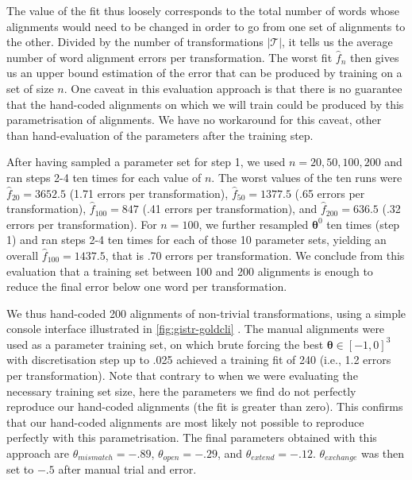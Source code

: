 The value of the fit thus loosely corresponds to the total number of
words whose alignments would need to be changed in order to go from one
set of alignments to the other. Divided by the number of transformations
\(|\mathcal{T}|\), it tells us the average number of word alignment
errors per transformation. The worst fit \(\hat{f}_n\) then gives us an
upper bound estimation of the error that can be produced by training on
a set of size \(n\). One caveat in this evaluation approach is that
there is no guarantee that the hand-coded alignments on which we will
train could be produced by this parametrisation of alignments. We have
no workaround for this caveat, other than hand-evaluation of the
parameters after the training step.

After having sampled a parameter set for step 1, we used
\(n = 20, 50, 100, 200\) and ran steps 2-4 ten times for each value of
\(n\). The worst values of the ten runs were \(\hat{f}_{20} = 3652.5\)
(1.71 errors per transformation), \(\hat{f}_{50} = 1377.5\) (.65 errors
per transformation), \(\hat{f}_{100} = 847\) (.41 errors per
transformation), and \(\hat{f}_{200} = 636.5\) (.32 errors per
transformation). For \(n = 100\), we further resampled \(\bm{\theta}^0\)
ten times (step 1) and ran steps 2-4 ten times for each of those 10
parameter sets, yielding an overall \(\hat{f}_{100} = 1437.5\), that is
.70 errors per transformation. We conclude from this evaluation that a
training set between 100 and 200 alignments is enough to reduce the
final error below one word per transformation.

We thus hand-coded 200 alignments of non-trivial transformations, using
a simple console interface illustrated in \cref{fig:gistr-goldcli} 
. 
The
manual alignments were used as a parameter training set, on which brute
forcing the best \(\bm{\theta} \in [-1, 0]^3\) with discretisation step
up to .025 achieved a training fit of 240 (i.e., 1.2 errors per
transformation). Note that contrary to when we were evaluating the
necessary training set size, here the parameters we find do not
perfectly reproduce our hand-coded alignments (the fit is greater than
zero). This confirms that our hand-coded alignments are most likely not
possible to reproduce perfectly with this parametrisation. The final
parameters obtained with this approach are \(\theta_{mismatch} = -.89\),
\(\theta_{open} = -.29\), and \(\theta_{extend} = -.12\).
\(\theta_{exchange}\) was then set to \(-.5\) after manual trial and
error.

%

